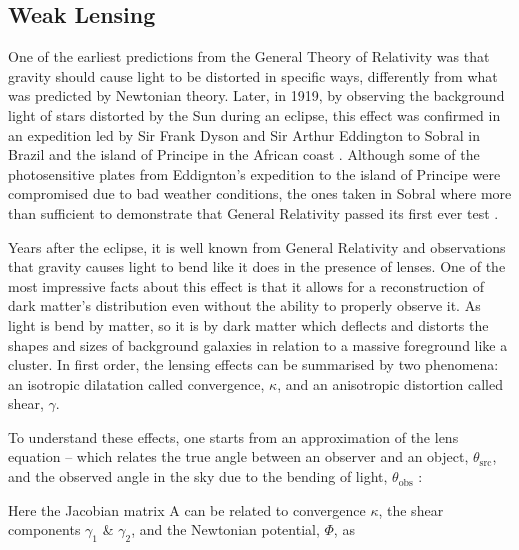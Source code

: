 \subsection{Weak Lensing}
One of the earliest predictions from the General Theory of Relativity was that gravity should cause light to be distorted in specific ways, differently from what was predicted by Newtonian theory. Later, in 1919, by observing the background light of stars distorted by the Sun during an eclipse, this effect was confirmed in an expedition led by Sir Frank Dyson and Sir Arthur Eddington to Sobral in Brazil and the island of Principe in the African coast \citep{Dyson291}. Although some of the photosensitive plates from Eddignton's expedition to the island of Principe were compromised due to bad weather conditions, the ones taken in Sobral where more than sufficient to demonstrate that General Relativity passed its first ever test \citep{2007arXiv0709.0685K}.


\qquad Years after the eclipse, it is well known from General Relativity and observations that gravity causes light to bend like it does in the presence of lenses. One of the most impressive facts about this effect is that it allows for a reconstruction of dark matter's distribution even without the ability to properly observe it. As light is bend by matter, so it is by dark matter which deflects and distorts the shapes and sizes of background galaxies in relation to a massive foreground like a cluster. In first order, the lensing effects can be summarised by two phenomena: an isotropic dilatation called convergence, $\kappa$, and an anisotropic distortion called shear, $\gamma$. 

\qquad To understand these effects, one starts from an approximation of the lens equation -- which relates the true angle between an observer and an object, $\theta_{\text{src}}$, and the observed angle in the sky due to the bending of light, $\theta_{\text{obs}}$ \citep{dods}:

Here the Jacobian matrix A can be related to convergence $\kappa$, the shear components $\gamma_1$ \& $\gamma_2$, and the Newtonian potential, $\Phi$, as

